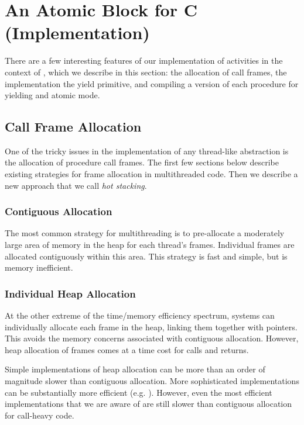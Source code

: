 \documentclass[sigplan,10pt,review,anonymous]{acmart}\settopmatter{printfolios=true,printccs=false,printacmref=false}
\begin{document}
\section{An Atomic Block for C (Implementation)}

There are a few interesting features of our implementation of activities in the context of \charcoal{}, which we describe in this section: the allocation of call frames, the implementation the yield primitive, and compiling a version of each procedure for yielding and atomic mode.

\subsection{Call Frame Allocation}

One of the tricky issues in the implementation of any thread-like abstraction is the allocation of procedure call frames.
The first few sections below describe existing strategies for frame allocation in multithreaded code.
Then we describe a new approach that we call \emph{hot stacking}.

\subsubsection{Contiguous Allocation}

The most common strategy for multithreading is to pre-allocate a moderately large area of memory in the heap for each thread's frames.
Individual frames are allocated contiguously within this area.
This strategy is fast and simple, but is memory inefficient.

\subsubsection{Individual Heap Allocation}

At the other extreme of the time/memory efficiency spectrum, systems can individually allocate each frame in the heap, linking them together with pointers.
This avoids the memory concerns associated with contiguous allocation.
However, heap allocation of frames comes at a time cost for calls and returns.

Simple implementations of heap allocation can be more than an order of magnitude slower than contiguous allocation.
More sophisticated implementations can be substantially more efficient (e.g. \cite{Shao2000}).
However, even the most efficient implementations that we are aware of are still slower than contiguous allocation for call-heavy code.
\end{document}

